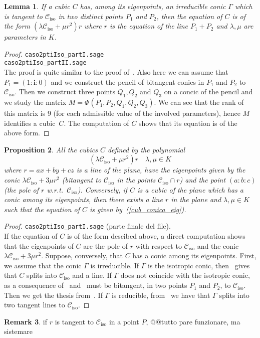 \documentclass[11pt, a4paper, reqno, captions=tableheading,bibliography=totoc]{scrartcl}
\theoremstyle{plain}
\newtheorem{lemma}{Lemma}[section]
\newtheorem{prop}[lemma]{Proposition}
\theoremstyle{definition}
\newtheorem{rmk}[lemma]{Remark}
\newcommand{\iso}{\mathcal{C}_{\mathrm{iso}}}
\newcommand{\iii}{\textbf{i}}
\begin{document}
\begin{lemma}
\label{lemma:bitangentToCiso}
If a cubic $C$ has, among its eigenpoints, an irreducible conic $\Gamma$
which is tangent to $\iso$ in two distinct points $P_1$ and $P_2$, then
the equation of $C$ is of the form $(\lambda \iso + \mu r^2)r$ where
$r$ is the equation of the line $P_1+P_2$ and $\lambda, \mu$ are parameters
in $K$. 
\end{lemma}
\begin{proof}
\verb+caso2ptiIso_partI.sage+\\
\verb+caso2ptiIso_partII.sage+\\
The proof is quite similar to the proof of~. Also
here we can assume that $P_1 = (1: \iii: 0)$ and we construct the pencil of
bitangent conics in $P_1$ and $P_2$ to $\iso$. Then we construct three
points $Q_1, Q_2$ and $Q_3$ on a concic of the pencil
and we study the matrix $M = \Phi(P_1, P_2, Q_1, Q_2, Q_3)$. We can see
that the rank of this matrix is $9$ (for each admissible value of the
involved parameters), hence $M$ identifies a cubic~$C$. The computation
of $C$ shows that its equation is of the above form.
\end{proof}


\begin{prop} All the cubics $C$ defined by the polynomial
\begin{equation}
\label{cub_conica_eig}
(\lambda \iso + \mu r^2)r \quad \mbox{$\lambda, \mu \in K$}
\end{equation}
where $r=ax+by+cz$ is a line of the plane, 
have the eigenpoints given by the conic 
$\lambda \iso+3\mu r^2$ (bitangent to $\iso$ in the points $\iso \cap r$)
and the point $(a:b:c)$ (the pole of $r$
w.r.t.\ $\iso$). Conversely, if 
$C$ is a cubic of the plane which has a conic among its eigenpoints, 
then there exists a line $r$ in the plane and $\lambda, \mu \in K$
such that the equation of 
$C$ is given by~(\ref{cub_conica_eig}).
\end{prop}
\begin{proof}
\verb+caso2ptiIso_partI.sage+ (parte finale del file).\\
If the equation of $C$ is of the form descibed above, a direct computation
shows that the eigenpoints of $C$ are the pole of $r$ with respect to $\iso$
and the conic $\lambda \iso+3\mu r^2$. Suppose, conversely, that $C$ has
a conic among its eigenpoints. First, we assume that the conic $\Gamma$
is irreducible. If $\Gamma$ is the isotropic conic,
then~ gives that $C$ splits into $\iso$ and a line.
If $\Gamma$ does not coincide with the
isotropic conic, as a consequence
of~ and~ must be bitangent,
in two points $P_1$ and $P_2$, to $\iso$. Then we get the thesis
from~. If $\Gamma$ is reducible, 
from~  we have that $\Gamma$ splits
into two tangent lines to $\iso$.
\end{proof}
\begin{rmk}
if $r$ is tangent to $\iso$ in a point $P$, @@tutto pare funzionare,
ma sistemare
\end{rmk}
\end{document}
